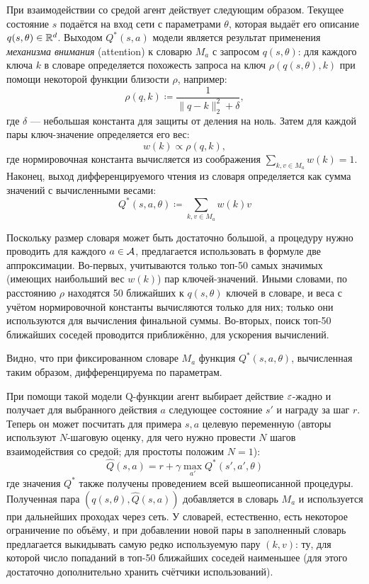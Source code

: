 При взаимодействии со средой агент действует следующим образом. Текущее состояние $s$ подаётся на вход сети с параметрами $\theta$, которая выдаёт его описание $q(s, \theta) \in \mathbb{R}^d$. Выходом $Q^*(s, a)$ модели является результат применения \emph{механизма внимания} (attention) к словарю $M_a$ с запросом $q(s, \theta)$: для каждого ключа $k$ в словаре определяется похожесть запроса на ключ $\rho(q(s, \theta), k)$ при помощи некоторой функции близости $\rho$, например:
$$\rho(q, k) \coloneqq \frac{1}{\|q - k\|_2^2 + \delta},$$
где $\delta$ --- небольшая константа для защиты от деления на ноль. Затем для каждой пары ключ-значение определяется его вес:
$$w(k) \propto \rho(q, k),$$
где нормировочная константа вычисляется из соображения $\sum_{k, v \in M_a} w(k) = 1$. Наконец, выход дифференцируемого чтения из словаря определяется как сумма значений с вычисленными весами:
$$Q^*(s, a, \theta) \coloneqq \sum_{k, v \in M_a} w(k)v$$

Поскольку размер словаря может быть достаточно большой, а процедуру нужно проводить для каждого $a \in \mathcal{A}$, предлагается использовать в формуле две аппроксимации. Во-первых, учитываются только топ-50 самых значимых (имеющих наибольший вес $w(k)$) пар ключей-значений. Иными словами, по расстоянию $\rho$ находятся 50 ближайших к $q(s, \theta)$ ключей в словаре, и веса с учётом нормировочной константы вычисляются только для них; только они используются для вычисления финальной суммы. Во-вторых, поиск топ-50 ближайших соседей проводится приближённо, для ускорения вычислений.

Видно, что при фиксированном словаре $M_a$ функция $Q^*(s, a, \theta)$, вычисленная таким образом, дифференцируема по параметрам.

При помощи такой модели Q-функции агент выбирает действие $\varepsilon$-жадно и получает для выбранного действия $a$ следующее состояние $s'$ и награду за шаг $r$. Теперь он может посчитать для примера $s, a$ целевую переменную (авторы используют $N$-шаговую оценку, для чего нужно провести $N$ шагов взаимодействия со средой; для простоты положим $N=1$):
$$\hat{Q}(s, a) = r + \gamma \max_{a'} Q^*(s', a', \theta)$$
где значения $Q^*$ также получены проведением всей вышеописанной процедуры. Полученная пара $(q(s, \theta), \hat{Q}(s, a))$ добавляется в словарь $M_a$ и используется при дальнейших проходах через сеть. У словарей, естественно, есть некоторое ограничение по объёму, и при добавлении новой пары в заполненный словарь предлагается выкидывать самую редко используемую пару $(k, v)$: ту, для которой число попаданий в топ-50 ближайших соседей наименьшее (для этого достаточно дополнительно хранить счётчики использований).

